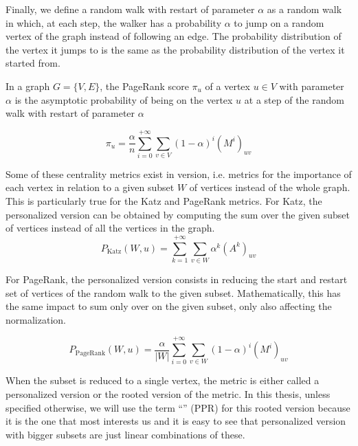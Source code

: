 Finally, we define a random walk with restart of parameter $\alpha$ as a random walk in which, at each step, the walker has a probability $\alpha$ to jump on a random vertex of the graph instead of following an edge. The probability distribution of the vertex it jumps to is the same as the probability distribution of the vertex it started from.

\begin{definition}
    In a graph $G = \{V, E\}$, the PageRank score $\pi_u$ of a vertex $u\in V$ with parameter $\alpha$ is the asymptotic probability of being on the vertex $u$ at a step of the random walk with restart of parameter $\alpha$

    \begin{equation}
        \pi_u = \frac{\alpha}{n} \sum_{i=0}^{+\infty} \sum_{v \in V} (1-\alpha)^i (M^i)_{uv}
    \end{equation}
\end{definition}

Some of these centrality metrics exist in   version, i.e. metrics for the importance of each vertex in relation to a given subset $W$ of vertices instead of the whole graph. This is particularly true for the Katz and PageRank metrics. For Katz, the personalized version can be obtained by computing the sum over the given subset of vertices instead of all the vertices in the graph.
\begin{equation}
    P_{\text{Katz}}(W, u) = \sum_{k= 1}^{+\infty}\sum_{v\in W} \alpha^k (A^k)_{uv}
\end{equation}

For PageRank, the personalized version consists in reducing the start and restart set of vertices of the random walk to the given subset. Mathematically, this has the same impact to sum only over on the given subset, only also affecting the normalization.

\begin{equation}
    P_{\text{PageRank}}(W, u) = \frac{\alpha}{|W|} \sum_{i=0}^{+\infty} \sum_{v \in W} (1-\alpha)^i (M^i)_{uv}
\end{equation}

When the subset is reduced to a single vertex, the metric is either called a personalized version or the rooted version of the metric. In this thesis, unless specified otherwise, we will use the term “” (PPR) for this rooted version because it is the one that most interests us and it is easy to see that personalized version with bigger subsets are just linear combinations of these.

